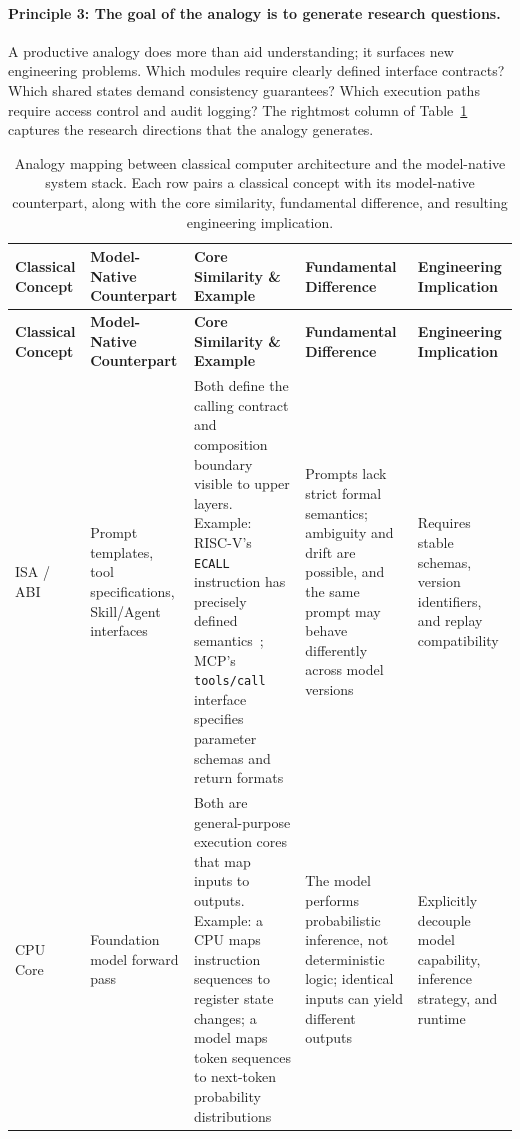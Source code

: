 \paragraph{Principle 3: The goal of the analogy is to generate research questions.}
A productive analogy does more than aid understanding; it surfaces new engineering problems.
Which modules require clearly defined interface contracts?
Which shared states demand consistency guarantees?
Which execution paths require access control and audit logging?
The rightmost column of Table~\ref{tab:mapping} captures the research directions that the analogy generates.


\scriptsize
\renewcommand{\arraystretch}{1.25}
\begin{longtable}{p{}p{}p{}p{}p{}}
\caption{Analogy mapping between classical computer architecture and the model-native system stack. Each row pairs a classical concept with its model-native counterpart, along with the core similarity, fundamental difference, and resulting engineering implication.}
\label{tab:mapping} \\
\toprule
\textbf{Classical Concept} & \textbf{Model-Native Counterpart} & \textbf{Core Similarity \& Example} & \textbf{Fundamental Difference} & \textbf{Engineering Implication} \\
\midrule
\endfirsthead
\toprule
\textbf{Classical Concept} & \textbf{Model-Native Counterpart} & \textbf{Core Similarity \& Example} & \textbf{Fundamental Difference} & \textbf{Engineering Implication} \\
\midrule
\endhead

ISA / ABI & Prompt templates, tool specifications, Skill/Agent interfaces & Both define the calling contract and composition boundary visible to upper layers. Example: RISC-V's \texttt{ECALL} instruction has precisely defined semantics~\cite{riscv_spec_2026}; MCP's \texttt{tools/call} interface specifies parameter schemas and return formats~\cite{mcp_intro_2026} & Prompts lack strict formal semantics; ambiguity and drift are possible, and the same prompt may behave differently across model versions & Requires stable schemas, version identifiers, and replay compatibility \\[3pt]

CPU Core & Foundation model forward pass & Both are general-purpose execution cores that map inputs to outputs. Example: a CPU maps instruction sequences to register state changes; a model maps token sequences to next-token probability distributions~\cite{vaswani2017attention,brown2020gpt3} & The model performs probabilistic inference, not deterministic logic; identical inputs can yield different outputs & Explicitly decouple model capability, inference strategy, and runtime \\[3pt]


\end{longtable}
